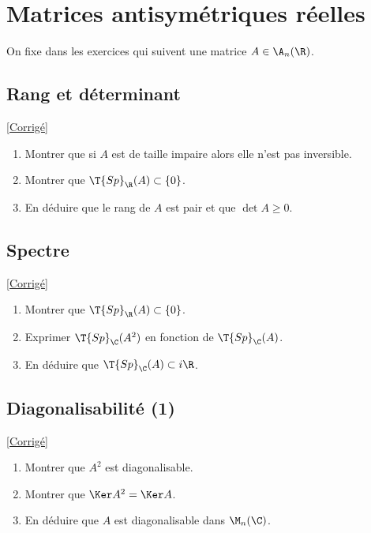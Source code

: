 \documentclass[8pt]{book}
\begin{document}
\section{Matrices antisymétriques réelles}
On fixe dans les exercices qui suivent une matrice $A\in \A_n(\R)$.

\subsection{Rang et déterminant}
\label{Rang et déterminant}
\textcolor{blue}{\hyperref[Rang et déterminant corrigé]{[Corrigé]}}\\
\begin{enumerate}[leftmargin=*]
	\item Montrer que si $A$ est de taille impaire alors elle n'est pas inversible.
	\item Montrer que $\T{Sp}_\R(A)\subset\{0\}$.
	\item En déduire que le rang de $A$ est pair et que $\det A\geq 0$.
\end{enumerate}

\subsection{Spectre}
\label{Spectre}
\textcolor{blue}{\hyperref[Spectre corrigé]{[Corrigé]}}\\
\begin{enumerate}[leftmargin=*]
	\item Montrer que $\T{Sp}_\R(A)\subset\{0\}$.
	\item Exprimer $\T{Sp}_\C(A^2)$ en fonction de $\T{Sp}_\C(A)$.
	\item En déduire que $\T{Sp}_\C(A)\subset i\R$.
\end{enumerate}

\subsection{Diagonalisabilité (1)}
\label{Diagonalisabilité (1)}
\textcolor{blue}{\hyperref[Diagonalisabilité (1) corrigé]{[Corrigé]}}\\
\begin{enumerate}[leftmargin=*]
	\item Montrer que $A^2$ est diagonalisable.
	\item Montrer que $\Ker A^2=\Ker A$.
	\item En déduire que $A$ est diagonalisable dans $\M_n(\C)$.
\end{enumerate}
\end{document}
